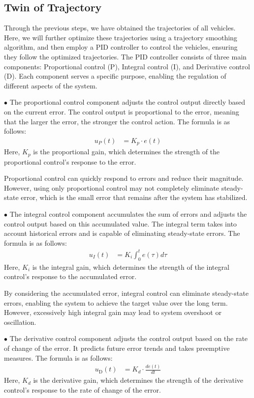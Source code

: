 \subsection{Twin of Trajectory}

Through the previous steps, we have obtained the trajectories of all vehicles. 
Here, we will further optimize these trajectories using a trajectory smoothing algorithm, and then employ a PID controller to control the vehicles, ensuring they follow the optimized trajectories\cite{Alpher22d}. 
The PID controller consists of three main components: Proportional control (P), Integral control (I), and Derivative control (D). Each component serves a specific purpose, enabling the regulation of different aspects of the system.

$\bullet$ The proportional control component adjusts the control output directly based on the current error. 
The control output is proportional to the error, meaning that the larger the error, the stronger the control action. 
The formula is as follows:
\begin{align}
	u_{P}(t) & = K_{p} \cdot e(t)
\end{align}
Here, $K_{p}$ is the proportional gain, which determines the strength of the proportional control's response to the error.

Proportional control can quickly respond to errors and reduce their magnitude.
However, using only proportional control may not completely eliminate steady-state error, which is the small error that remains after the system has stabilized.

$\bullet$ The integral control component accumulates the sum of errors and adjusts the control output based on this accumulated value. 
The integral term takes into account historical errors and is capable of eliminating steady-state errors. 
The formula is as follows:
\begin{align}
	u_{I}(t) & = K_{i} \int_{0}^{t} e(\tau) d \tau
\end{align}
Here, $K_{i}$ is the integral gain, which determines the strength of the integral control's response to the accumulated error. 

By considering the accumulated error, integral control can eliminate steady-state errors, enabling the system to achieve the target value over the long term. 
However, excessively high integral gain may lead to system overshoot or oscillation.

$\bullet$ The derivative control component adjusts the control output based on the rate of change of the error. 
It predicts future error trends and takes preemptive measures. 
The formula is as follows:
\begin{align}
	u_{\mathrm{D}}(t) & = K_{d} \cdot \frac{d e(t)}{d t}
\end{align}
Here, $K_{d}$ is the derivative gain, which determines the strength of the derivative control's response to the rate of change of the error.

